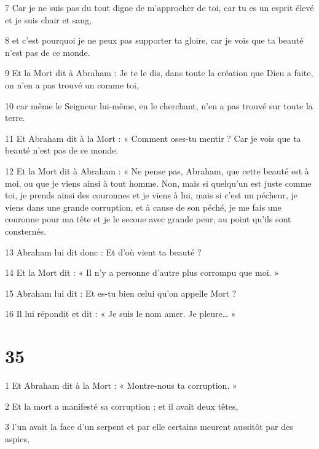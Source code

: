 \par 7 Car je ne suis pas du tout digne de m'approcher de toi, car tu es un esprit élevé et je suis chair et sang,

\par 8 et c'est pourquoi je ne peux pas supporter ta gloire, car je vois que ta beauté n'est pas de ce monde.

\par 9 Et la Mort dit à Abraham : Je te le dis, dans toute la création que Dieu a faite, on n'en a pas trouvé un comme toi,

\par 10 car même le Seigneur lui-même, en le cherchant, n'en a pas trouvé sur toute la terre.

\par 11 Et Abraham dit à la Mort : « Comment oses-tu mentir ? Car je vois que ta beauté n’est pas de ce monde.

\par 12 Et la Mort dit à Abraham : « Ne pense pas, Abraham, que cette beauté est à moi, ou que je viens ainsi à tout homme. Non, mais si quelqu'un est juste comme toi, je prends ainsi des couronnes et je viens à lui, mais si c'est un pécheur, je viens dans une grande corruption, et à cause de son péché, je me fais une couronne pour ma tête et je le secoue avec grande peur, au point qu’ils sont consternés.

\par 13 Abraham lui dit donc : Et d'où vient ta beauté ?

\par 14 Et la Mort dit : « Il n'y a personne d'autre plus corrompu que moi. »

\par 15 Abraham lui dit : Et es-tu bien celui qu'on appelle Mort ?

\par 16 Il lui répondit et dit : « Je suis le nom amer. Je pleure… »

\chapter{35}

\par 1 Et Abraham dit à la Mort : « Montre-nous ta corruption. »

\par 2 Et la mort a manifesté sa corruption ; et il avait deux têtes,

\par 3 l'un avait la face d'un serpent et par elle certains meurent aussitôt par des aspics,

